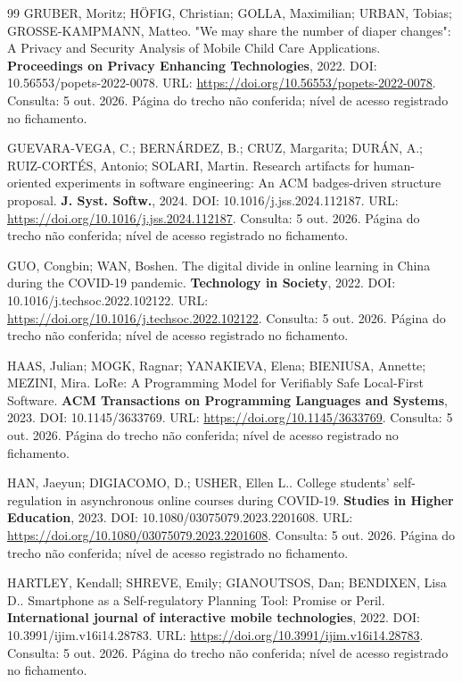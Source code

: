 \begin{thebibliography}{99}
 GRUBER, Moritz; HÖFIG, Christian; GOLLA, Maximilian; URBAN, Tobias; GROSSE-KAMPMANN, Matteo. "We may share the number of diaper changes": A Privacy and Security Analysis of Mobile Child Care Applications. \textbf{Proceedings on Privacy Enhancing Technologies}, 2022. DOI: 10.56553/popets-2022-0078. URL: \url{https://doi.org/10.56553/popets-2022-0078}. Consulta: 5 out. 2026. Página do trecho não conferida; nível de acesso registrado no fichamento.

 GUEVARA-VEGA, C.; BERNÁRDEZ, B.; CRUZ, Margarita; DURÁN, A.; RUIZ-CORTÉS, Antonio; SOLARI, Martin. Research artifacts for human-oriented experiments in software engineering: An ACM badges-driven structure proposal. \textbf{J. Syst. Softw.}, 2024. DOI: 10.1016/j.jss.2024.112187. URL: \url{https://doi.org/10.1016/j.jss.2024.112187}. Consulta: 5 out. 2026. Página do trecho não conferida; nível de acesso registrado no fichamento.

 GUO, Congbin; WAN, Boshen. The digital divide in online learning in China during the COVID-19 pandemic. \textbf{Technology in Society}, 2022. DOI: 10.1016/j.techsoc.2022.102122. URL: \url{https://doi.org/10.1016/j.techsoc.2022.102122}. Consulta: 5 out. 2026. Página do trecho não conferida; nível de acesso registrado no fichamento.

 HAAS, Julian; MOGK, Ragnar; YANAKIEVA, Elena; BIENIUSA, Annette; MEZINI, Mira. LoRe: A Programming Model for Verifiably Safe Local-First Software. \textbf{ACM Transactions on Programming Languages and Systems}, 2023. DOI: 10.1145/3633769. URL: \url{https://doi.org/10.1145/3633769}. Consulta: 5 out. 2026. Página do trecho não conferida; nível de acesso registrado no fichamento.

 HAN, Jaeyun; DIGIACOMO, D.; USHER, Ellen L.. College students’ self-regulation in asynchronous online courses during COVID-19. \textbf{Studies in Higher Education}, 2023. DOI: 10.1080/03075079.2023.2201608. URL: \url{https://doi.org/10.1080/03075079.2023.2201608}. Consulta: 5 out. 2026. Página do trecho não conferida; nível de acesso registrado no fichamento.

 HARTLEY, Kendall; SHREVE, Emily; GIANOUTSOS, Dan; BENDIXEN, Lisa D.. Smartphone as a Self-regulatory Planning Tool: Promise or Peril. \textbf{International journal of interactive mobile technologies}, 2022. DOI: 10.3991/ijim.v16i14.28783. URL: \url{https://doi.org/10.3991/ijim.v16i14.28783}. Consulta: 5 out. 2026. Página do trecho não conferida; nível de acesso registrado no fichamento.


\end{thebibliography}
